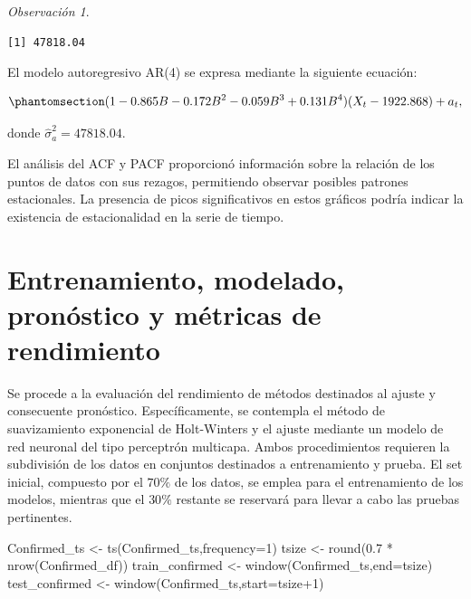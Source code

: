 \documentclass[
  us-letterpaper,
]{scrreprt}
\newenvironment{Shaded}{\begin{snugshade}}{\end{snugshade}}
\newcommand{\AttributeTok}[1]{\textcolor[rgb]{0.40,0.45,0.13}{#1}}
\newcommand{\CommentTok}[1]{\textcolor[rgb]{0.37,0.37,0.37}{#1}}
\newcommand{\DecValTok}[1]{\textcolor[rgb]{0.68,0.00,0.00}{#1}}
\newcommand{\FloatTok}[1]{\textcolor[rgb]{0.68,0.00,0.00}{#1}}
\newcommand{\FunctionTok}[1]{\textcolor[rgb]{0.28,0.35,0.67}{#1}}
\newcommand{\NormalTok}[1]{\textcolor[rgb]{0.00,0.23,0.31}{#1}}
\newcommand{\OtherTok}[1]{\textcolor[rgb]{0.00,0.23,0.31}{#1}}
\newcommand{\SpecialCharTok}[1]{\textcolor[rgb]{0.37,0.37,0.37}{#1}}
\theoremstyle{plain}
\theoremstyle{definition}
\theoremstyle{definition}
\theoremstyle{plain}
\theoremstyle{remark}
\newtheorem*{remark}{Observación}
\begin{document}
\begin{remark}
\begin{Shaded}
\end{Shaded}

\begin{verbatim}
[1] 47818.04
\end{verbatim}

El modelo autoregresivo AR(4) se expresa mediante la siguiente ecuación:

\begin{equation}\phantomsection\label{eq-AR4}{
(1-0.865B-0.172B^2-0.059B^3+0.131B^4)(X_t-1922.868)+a_t,
}\end{equation}

donde \(\hat{\sigma}_a^2 = 47818.04\).
\end{remark}

El análisis del ACF y PACF proporcionó información sobre la relación de
los puntos de datos con sus rezagos, permitiendo observar posibles
patrones estacionales. La presencia de picos significativos en estos
gráficos podría indicar la existencia de estacionalidad en la serie de
tiempo.

\section{Entrenamiento, modelado, pronóstico y métricas de
rendimiento}\label{entrenamiento-modelado-pronuxf3stico-y-muxe9tricas-de-rendimiento}

Se procede a la evaluación del rendimiento de métodos destinados al
ajuste y consecuente pronóstico. Específicamente, se contempla el método
de suavizamiento exponencial de Holt-Winters y el ajuste mediante un
modelo de red neuronal del tipo perceptrón multicapa. Ambos
procedimientos requieren la subdivisión de los datos en conjuntos
destinados a entrenamiento y prueba. El set inicial, compuesto por el
\(70\%\) de los datos, se emplea para el entrenamiento de los modelos,
mientras que el \(30\%\) restante se reservará para llevar a cabo las
pruebas pertinentes.

\begin{Shaded}
\begin{Highlighting}[]
\NormalTok{Confirmed\_ts }\OtherTok{\textless{}{-}} \FunctionTok{ts}\NormalTok{(Confirmed\_ts,}\AttributeTok{frequency=}\DecValTok{1}\NormalTok{)}
\NormalTok{tsize }\OtherTok{\textless{}{-}} \FunctionTok{round}\NormalTok{(}\FloatTok{0.7} \SpecialCharTok{*} \FunctionTok{nrow}\NormalTok{(Confirmed\_df))}
\NormalTok{train\_confirmed }\OtherTok{\textless{}{-}} \FunctionTok{window}\NormalTok{(Confirmed\_ts,}\AttributeTok{end=}\NormalTok{tsize)}
\NormalTok{test\_confirmed }\OtherTok{\textless{}{-}} \FunctionTok{window}\NormalTok{(Confirmed\_ts,}\AttributeTok{start=}\NormalTok{tsize}\SpecialCharTok{+}\DecValTok{1}\NormalTok{)}
\end{Highlighting}
\end{Shaded}
\end{document}
